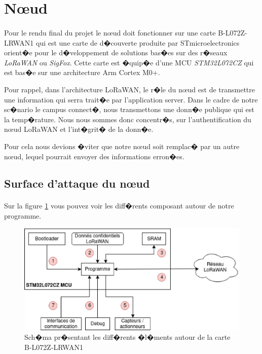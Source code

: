 \documentclass[a4paper, titlepage,12pt]{report}
\begin{document}
\section{N\oe{}ud}
\paragraph{}
Pour le rendu final du projet le n\oe{}ud doit fonctionner sur une carte B-L072Z-LRWAN1\cite{cartelora} qui est une carte de d�couverte produite par STmicroelectronics orient�e pour le d�veloppement de solutions bas�es sur des r�seaux \textit{LoRaWAN} ou \textit{SigFox}. Cette carte est �quip�e d'une MCU \textit{STM32L072CZ} qui est bas�e sur une architecture Arm Cortex M0+.

Pour rappel, dans l'architecture LoRaWAN, le r�le du n\oe{}ud est de transmettre une information qui serra trait�e par l'application server.
Dans le cadre de notre sc�nario le campus connect�, nous transmettons une donn�e publique qui est la temp�rature. Nous nous sommes donc concentr�s, sur l'authentification du n\oe{}ud LoRaWAN et l'int�grit� de la donn�e.

Pour cela nous devions �viter que notre n\oe{}ud soit remplac� par un autre n\oe{}ud, lequel pourrait envoyer des informations erron�es.

\subsection{Surface d'attaque du n\oe{}ud}
\paragraph{}
Sur la figure \ref{Sch�ma vecteur attaque B-L072Z-LRWAN1} vous pouvez voir les diff�rents composant autour de notre programme.
\begin{figure}[!h]
\centering
\includegraphics[scale=0.75]{img/eps/ModeledemenaceNoued.eps}
\caption{Sch�ma pr�sentant les diff�rents �l�ments autour de la carte B-L072Z-LRWAN1}
\label{Sch�ma vecteur attaque B-L072Z-LRWAN1}
\end{figure}
\end{document}
